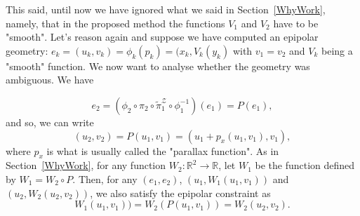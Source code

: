\documentclass{ipol}
\newcommand{\RR}{\ensuremath{\mathbb{R}}}
\newcommand{\Bund}[1]{\ensuremath{\mathcal{B}_{#1}}}
\newcommand{\BundO}{\Bund{1}}
\newcommand{\PiZVert}{\widetilde{\pi}_1^{\mathcal{Z}} }
\begin{document}

%

This said, until now we have ignored what we said in Section~\ref{WhyWork}, namely, that in the proposed method the functions $V_1$ and $V_2$ have to be "smooth". Let's reason again and suppose we have computed an epipolar geometry: $e_k=(u_k,v_k)=\phi_k(p_k) = (x_k,V_k(y_k)$ with $v_1=v_2$ and $V_k$ being a "smooth" function. We now want to analyse whether the geometry was ambiguous. We have 

\begin{equation*}
e_2 = (\phi_2 \circ  \pi_2 \circ  \PiZVert \circ  \phi_1^{-1}) (e_1) = P(e_1), 
\end{equation*}
and so, we can write
\begin{equation*}
(u_2,v_2) = P(u_1,v_1) = (u_1 + p_x(u_1,v_1),v_1),
\end{equation*}
%
where $p_x$ is what is usually called the "parallax function". As in Section~\ref{WhyWork}, for any function $W_2 : \RR^2 \rightarrow \RR  $, let $W_1$ be the function defined by $W_1 = W_2 \circ P$. Then, for any $(e_1,e_2)$, $(u_1,W_1(u_1,v_1))$ and $(u_2,W_2(u_2,v_2))$, we also satisfy the epipolar constraint as
\begin{equation*}
W_1(u_1,v_1)) = W_2 (P(u_1,v_1)) = W_2(u_2,v_2).
\end{equation*}

\end{document}
